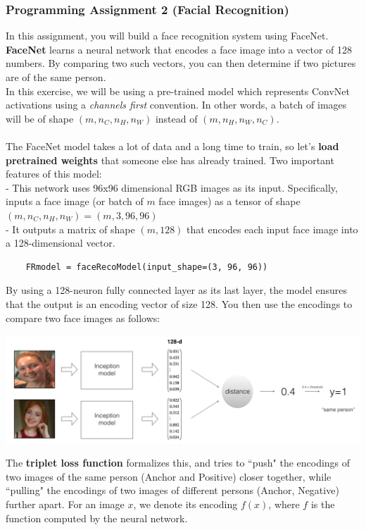\documentclass[11pt, a4paper]{article}
\begin{document}
\begin{spacing}{1.1}
	\subsubsection{Programming Assignment 2 (Facial Recognition)}
	In this assignment, you will build a face recognition system using FaceNet. \textbf{FaceNet} learns a neural network that encodes a face image into a vector of 128 numbers. By comparing two such vectors, you can then determine if two pictures are of the same person. \vspace*{2mm}\\
	In this exercise, we will be using a pre-trained model which represents ConvNet activations using a \textit{channels first} convention. In other words, a batch of images will be of shape $(m, n_C, n_H, n_W)$ instead of $(m, n_H, n_W, n_C)$. \\~\\
	The FaceNet model takes a lot of data and a long time to train, so let's \textbf{load pretrained weights} that someone else has already trained. Two important features of this model: \\
	- This network uses 96x96 dimensional RGB images as its input. Specifically, inputs a face image (or \hspace*{2mm} batch of $m$ face images) as a tensor of shape $(m, n_C, n_H, n_W) = (m, 3, 96, 96)$ \\
	- It outputs a matrix of shape $(m, 128)$ that encodes each input face image into a 128-dimensional vector.
	\begin{lstlisting}
	FRmodel = faceRecoModel(input_shape=(3, 96, 96)) \end{lstlisting} \vspace*{1mm}
	By using a 128-neuron fully connected layer as its last layer, the model ensures that the output is an encoding vector of size 128. You then use the encodings to compare two face images as follows:
	\begin{center}	\includegraphics[scale=.5]{face_model}	\end{center}
	The \textbf{triplet loss function} formalizes this, and tries to ``push" the encodings of two images of the same person (Anchor and Positive) closer together, while ``pulling" the encodings of two images of different persons (Anchor, Negative) further apart. For an image $x$, we denote its encoding $f(x)$, where $f$ is the function computed by the neural network. \vspace*{1mm}\\	

\end{spacing}
\end{document}
